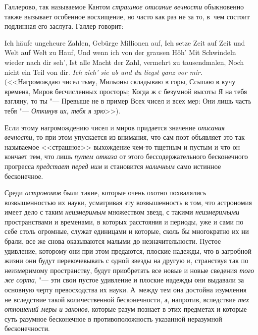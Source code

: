 Галлерово, так называемое Кантом {\em страшное описание вечности} обыкновенно
также вызывает особенное восхищение, но часто как раз не за то, в~чем состоит
подлинная его заслуга. Галлер говорит:

\begin{poem}{\footnotesize
Ich häufe ungeheure Zahlen, \verseline
Gebürge Millionen auf, \verseline
Ich setze Zeit auf Zeit und Welt auf Welt zu Hauf, \verseline
Und wenn ich von der grausen Höh' \verseline
Mit Schwindeln wieder nach dir seh', \verseline
Ist alle Macht der Zahl, vermehrt zu tausendmalen, \verseline
Noch nicht ein Teil von dir. \verseline
{\em Ich zieh' sie ab und du liegst ganz vor mir.} \verseline
\ \verseline}
(<<Нагромождаю чисел тьму, \verseline
Мильоны складываю в горы, \verseline
Ссыпаю в кучу времена, \verseline
Миров бесчисленных просторы; \verseline
Когда ж с безумной высоты \verseline
Я на тебя взгляну, то ты "--- \verseline
Превыше не в пример \verseline
Всех чисел и всех мер: \verseline
Они лишь часть тебя "--- \verseline
{\em Откинув их, тебя я зрю}>>).
\end{poem}

Если этому нагромождению чисел и миров придается значение
{\em описания вечности}, то при этом упускается из внимания, что сам поэт
объявляет это так называемое <<страшное>> выхождение чем-то тщетным и пустым и
что он кончает тем, что лишь {\em путем отказа} от этого бессодержательного
бесконечного прогресса {\em предстает перед ним} и становится {\em наличным}
само истинное бесконечное.

Среди {\em астрономов} были такие, которые очень охотно похвалялись
возвышенностью их науки, усматривая эту возвышенность в том, что астрономия
имеет дело с таким {\em неизмеримым} множеством звезд, с такими
{\em неизмеримыми} пространствами и временами, в которых расстояния и периоды,
уже и сами по себе столь огромные, служат единицами и которые, сколь бы
многократно их ни брали, все же снова оказываются малыми до незначительности.
Пустое удивление, которому они при этом предаются, плоские надежды, что в
загробной жизни они будут перекочевывать с одной звезды на другую и, странствуя
так по неизмеримому пространству, будут приобретать все новые и новые сведения
{\em того же сорта}, "--- эти свои пустое удивление и плоские надежды они
выдавали за основную черту превосходства их науки. А~между тем она достойна
изумления не вследствие такой количественной бесконечности, а, напротив,
вследствие {\em тех отношений меры и законов}, которые разум познает в этих
предметах и которые суть разумное бесконечное в противоположность указанной
неразумной бесконечности.

